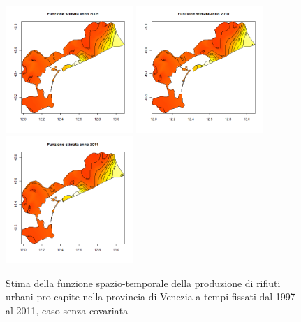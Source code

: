 \documentclass[a4paper,11pt,twoside,openright]{book}							%
\begin{document}
\begin{figure}[H]
	\includegraphics[width=0.43\textwidth ,height=0.235\textheight]{Immagini/venezia_senza_covariate/Anno2009.png}
	\includegraphics[width=0.43\textwidth ,height=0.235\textheight]{Immagini/venezia_senza_covariate/Anno2010.png}
	\includegraphics[width=0.43\textwidth ,height=0.235\textheight]{Immagini/venezia_senza_covariate/Anno2011.png}
\caption{Stima della funzione spazio-temporale della produzione di rifiuti urbani pro capite nella provincia di Venezia a tempi fissati dal 1997 al 2011, caso senza covariata}
\label{fig:Ven_ris}
\end{figure}
\newpage
\end{document}

